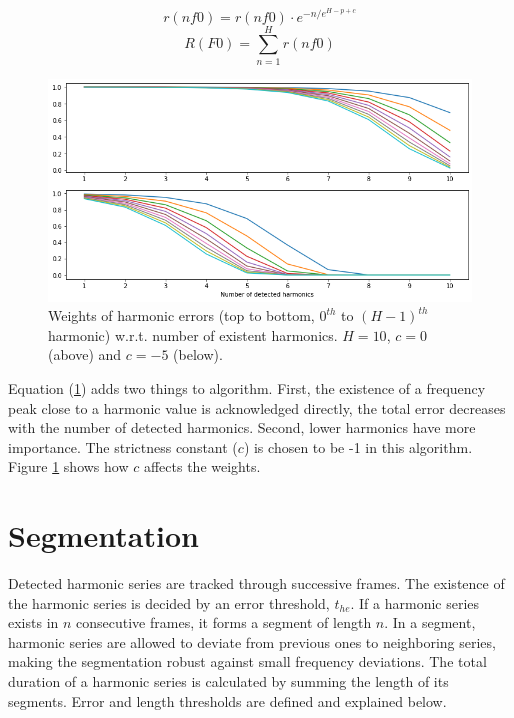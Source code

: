 \begin{equation}\label{wnerror}
    r(nf0) =  r(nf0)\cdot e^{-n / e^{H-p+c}}
\end{equation}  
\begin{equation}\label{toterror}
    R(F0) =  \sum_{n=1}^{H} r(nf0)
\end{equation}

\begin{figure}
    \centering
    \includegraphics[width=\columnwidth]{methods/hweights.png}
    \caption{Weights of harmonic errors (top to bottom, $0^{th}$ to $(H-1)^{th}$ harmonic) w.r.t. number of existent harmonics. $H = 10$, $c = 0$ (above) and $c = -5$ (below). }
    \label{fig:hweights}
\end{figure}

Equation (\ref{fig:hweights}) adds two things to algorithm. First, the existence of a frequency peak close to a harmonic value is acknowledged directly, the total error decreases with the number of detected harmonics. Second, lower harmonics have more importance. The strictness constant ($c$) is chosen to be -1 in this algorithm. Figure \ref{fig:hweights} shows how $c$ affects the weights.

\section{Segmentation}

Detected harmonic series are tracked through successive frames. The existence of the harmonic series is decided by an error threshold, $t_{he}$. If a harmonic series exists in $n$ consecutive frames, it forms a segment of length $n$. In a segment, harmonic series are allowed to deviate from previous ones to neighboring series, making the segmentation robust against small frequency deviations. The total duration of a harmonic series is calculated by summing the length of its segments. Error and length thresholds are defined and explained below.

